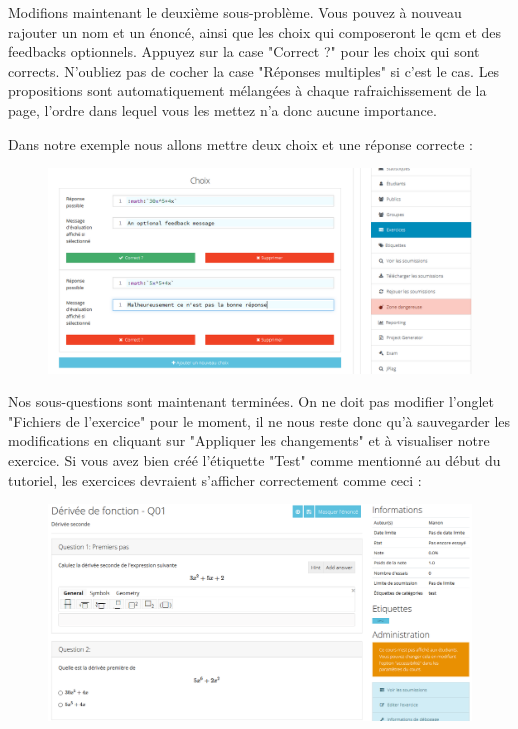 \documentclass{article}
\begin{document}
\newpage
Modifions maintenant le deuxième sous-problème. Vous pouvez à nouveau rajouter un nom et un énoncé, ainsi que les choix qui composeront le qcm et des feedbacks optionnels. Appuyez sur la case "Correct ?" pour les choix qui sont corrects. N'oubliez pas de cocher la case "Réponses multiples" si c'est le cas. Les propositions sont automatiquement mélangées à chaque rafraichissement de la page, l'ordre dans lequel vous les mettez n'a donc aucune importance. 
\bigskip

Dans notre exemple nous allons mettre deux choix et une réponse correcte :

\begin{figure}[!htb]
    \centering
    \includegraphics[scale=0.5]{images/qcm.png}
\end{figure}

\newpage
Nos sous-questions sont maintenant terminées. On ne doit pas modifier l'onglet "Fichiers de l'exercice" pour le moment, il ne nous reste donc qu'à sauvegarder les modifications en cliquant sur "Appliquer les changements" et à visualiser notre exercice.
Si vous avez bien créé l'étiquette "Test" comme mentionné au début du tutoriel, les exercices devraient s'afficher correctement comme ceci :

\begin{figure}[!htbp]
    \centering
    \includegraphics[scale=0.48]{images/exo_fini.png}
\end{figure}
\newpage
\end{document}
